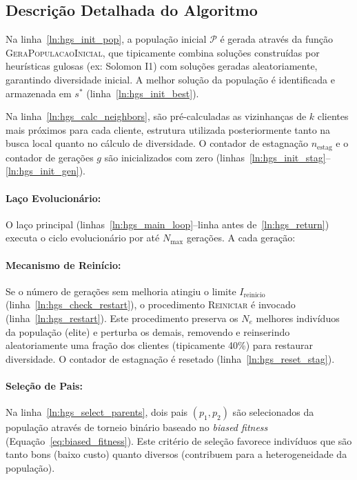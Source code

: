 \subsection{Descrição Detalhada do Algoritmo}

Na linha~\ref{ln:hgs_init_pop}, a população inicial $\mathcal{P}$ é gerada através da função \textsc{GeraPopulacaoInicial}, que tipicamente combina soluções construídas por heurísticas gulosas (ex: Solomon I1) com soluções geradas aleatoriamente, garantindo diversidade inicial. A melhor solução da população é identificada e armazenada em $s^*$ (linha~\ref{ln:hgs_init_best}).

Na linha~\ref{ln:hgs_calc_neighbors}, são pré-calculadas as vizinhanças de $k$ clientes mais próximos para cada cliente, estrutura utilizada posteriormente tanto na busca local quanto no cálculo de diversidade. O contador de estagnação $n_{\text{estag}}$ e o contador de gerações $g$ são inicializados com zero (linhas~\ref{ln:hgs_init_stag}--\ref{ln:hgs_init_gen}).

\paragraph{Laço Evolucionário:} O laço principal (linhas~\ref{ln:hgs_main_loop}--linha antes de~\ref{ln:hgs_return}) executa o ciclo evolucionário por até $N_{\max}$ gerações. A cada geração:

\paragraph{Mecanismo de Reinício:} Se o número de gerações sem melhoria atingiu o limite $I_{\text{reinicio}}$ (linha~\ref{ln:hgs_check_restart}), o procedimento \textsc{Reiniciar} é invocado (linha~\ref{ln:hgs_restart}). Este procedimento preserva os $N_e$ melhores indivíduos da população (elite) e perturba os demais, removendo e reinserindo aleatoriamente uma fração dos clientes (tipicamente 40\%) para restaurar diversidade. O contador de estagnação é resetado (linha~\ref{ln:hgs_reset_stag}).

\paragraph{Seleção de Pais:} Na linha~\ref{ln:hgs_select_parents}, dois pais $(p_1, p_2)$ são selecionados da população através de torneio binário baseado no \emph{biased fitness} (Equação~\eqref{eq:biased_fitness}). Este critério de seleção favorece indivíduos que são tanto bons (baixo custo) quanto diversos (contribuem para a heterogeneidade da população).

